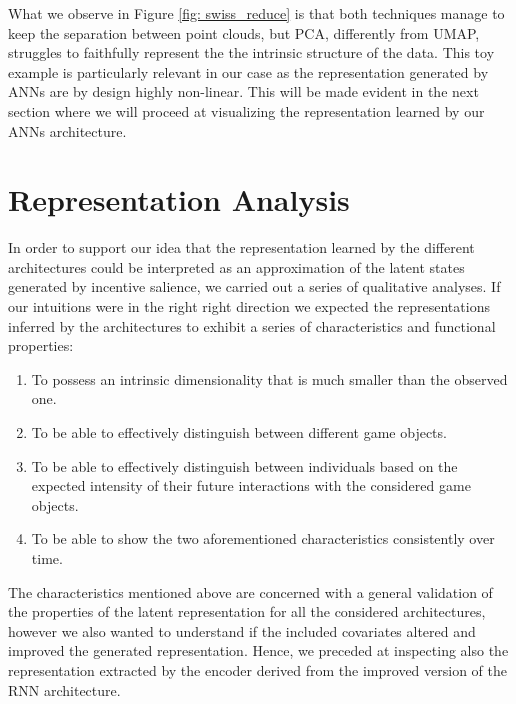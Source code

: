 What we observe in Figure  \ref{fig: swiss_reduce} is that both techniques manage to keep the separation between point clouds, but PCA, differently from UMAP, struggles to faithfully represent the the intrinsic structure of the data. This toy example is particularly relevant in our case as the representation generated by ANNs are by design highly non-linear. This will be made evident in the next section where we will proceed at visualizing the representation learned by our ANNs architecture.

\section{Representation Analysis}
\label{representation_analysis}
In order to support our idea that the representation learned by the different architectures could be interpreted as an approximation of the latent states generated by incentive salience, we carried out a series of qualitative analyses. If our intuitions were in the right right direction we expected the representations inferred by the architectures to exhibit a series of characteristics and functional properties:
\begin{enumerate}
    \item To possess an intrinsic dimensionality that is much smaller than the observed one.
    \item To be able to effectively distinguish between different game objects.
    \item To be able to effectively distinguish between individuals based on the expected intensity of their future interactions with the considered game objects.
    \item To be able to show the two aforementioned characteristics consistently over time.
\end{enumerate}

The characteristics mentioned above are concerned with a general validation of the properties of the latent representation for all the considered architectures, however we also wanted to understand if the included covariates altered and improved the generated representation.  Hence, we preceded at inspecting also the representation extracted by the encoder derived from the improved version of the RNN architecture. 

